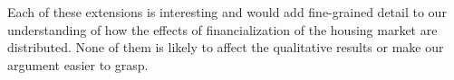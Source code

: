Each of these extensions is interesting and would add fine-grained detail to our understanding of how the effects of financialization of the housing market are distributed. None of them is likely to affect the qualitative results or make our argument easier to grasp.
